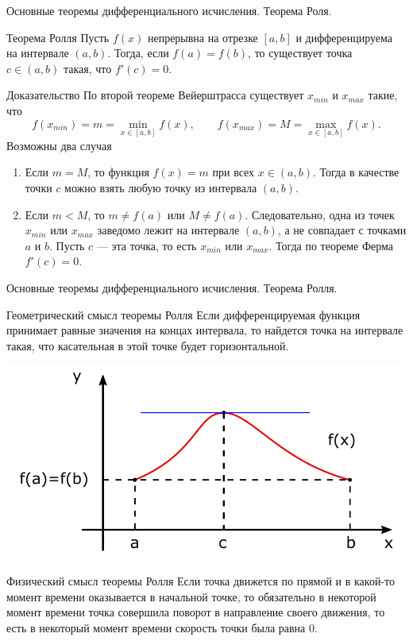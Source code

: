 \documentclass[8pt]{beamer}
\begin{document}
\begin{frame}{Основные теоремы дифференциального исчисления. Теорема Роля.}
\begin{block}{Теорема Ролля}
Пусть $f(x)$ непрерывна на отрезке $[a,b]$ и дифференцируема на интервале $(a,b)$. Тогда, если $f(a)=f(b)$, то существует точка $c\in(a,b)$ такая, что $f'(c)=0$.
\end{block} 
\begin{block}{Доказательство}
По второй теореме Вейерштрасса существует $x_{min}$ и $x_{max}$ такие, что
$$f(x_{min}) = m=\min_{x\in[a,b]} f(x),\qquad f(x_{max}) = M= \max_{x\in[a,b]} f(x).$$
Возможны два случая
\begin{enumerate}
\item Если $m=M$, то функция $f(x)=m$ при всех $x\in(a,b)$. Тогда в качестве точки $c$ можно взять любую точку из интервала $(a,b)$.
\item Если $m<M$, то $m\ne f(a)$ или $M\ne f(a)$. Следовательно, одна из точек $x_{min}$ или $x_{max}$ заведомо лежит на интервале $(a,b)$, а не совпадает с точками $a$ и $b$. Пусть $c$ --- эта точка, то есть $x_{min}$ или $x_{max}$. Тогда по теореме Ферма $f'(c)=0$.
\end{enumerate}
\end{block}
\end{frame}

\begin{frame}{Основные теоремы дифференциального исчисления. Теорема Ролля.}
\begin{block}{Геометрический смысл теоремы Ролля}
Если дифференцируемая функция принимает равные значения на концах интервала, то найдется точка на интервале такая, что касательная в этой точке будет горизонтальной.
\end{block} 
\begin{center}
\includegraphics[scale=0.5]{thRolly.pdf}
\end{center}
\begin{block}{Физический смысл теоремы Ролля}
Если точка движется по прямой и в какой-то момент времени оказывается в начальной точке, то обязательно в некоторой момент времени точка совершила поворот в направление своего движения, то есть в некоторый момент времени скорость точки была равна $0$. 
\end{block} 
\end{frame}
\end{document}
